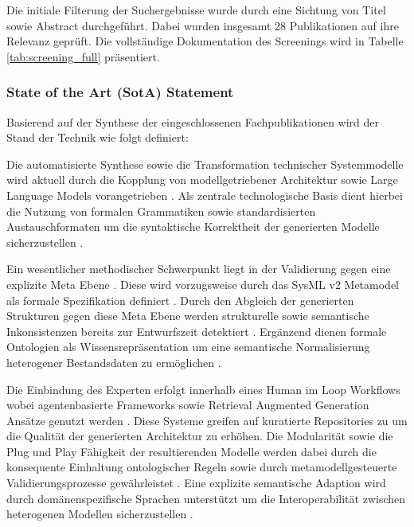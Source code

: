 Die initiale Filterung der Suchergebnisse wurde durch eine Sichtung von Titel sowie Abstract durchgeführt. Dabei wurden insgesamt 28 Publikationen auf ihre Relevanz geprüft. Die vollständige Dokumentation des Screenings wird in Tabelle \ref{tab:screening_full} präsentiert.

\subsubsection{State of the Art (SotA) Statement}

Basierend auf der Synthese der eingeschlossenen Fachpublikationen wird der Stand der Technik wie folgt definiert:

Die automatisierte Synthese sowie die Transformation technischer Systemmodelle wird aktuell durch die Kopplung von modellgetriebener Architektur sowie Large Language Models vorangetrieben \cite{Pan.2025, Cibrian.2025}. Als zentrale technologische Basis dient hierbei die Nutzung von formalen Grammatiken sowie standardisierten Austauschformaten um die syntaktische Korrektheit der generierten Modelle sicherzustellen \cite{Li.2022, Cafe.2013}.

Ein wesentlicher methodischer Schwerpunkt liegt in der Validierung gegen eine explizite Meta Ebene \cite{Kapos.2014, Cibrian.2025b}. Diese wird vorzugsweise durch das SysML v2 Metamodel als formale Spezifikation definiert \cite{Cibrian.2025b}. Durch den Abgleich der generierten Strukturen gegen diese Meta Ebene werden strukturelle sowie semantische Inkonsistenzen bereits zur Entwurfszeit detektiert \cite{Kapos.2014, Cibrian.2025b}. Ergänzend dienen formale Ontologien als Wissensrepräsentation um eine semantische Normalisierung heterogener Bestandsdaten zu ermöglichen \cite{Meng.2025, Abonyi.2024}.

Die Einbindung des Experten erfolgt innerhalb eines Human im Loop Workflows wobei agentenbasierte Frameworks sowie Retrieval Augmented Generation Ansätze genutzt werden \cite{Cibrian.2025, Chis.2025}. Diese Systeme greifen auf kuratierte Repositories zu um die Qualität der generierten Architektur zu erhöhen. Die Modularität sowie die Plug und Play Fähigkeit der resultierenden Modelle werden dabei durch die konsequente Einhaltung ontologischer Regeln sowie durch metamodellgesteuerte Validierungsprozesse gewährleistet \cite{Ferko.2026, Ahlbrecht.2024}. Eine explizite semantische Adaption wird durch domänenspezifische Sprachen unterstützt um die Interoperabilität zwischen heterogenen Modellen sicherzustellen \cite{Meyers.2013}.

